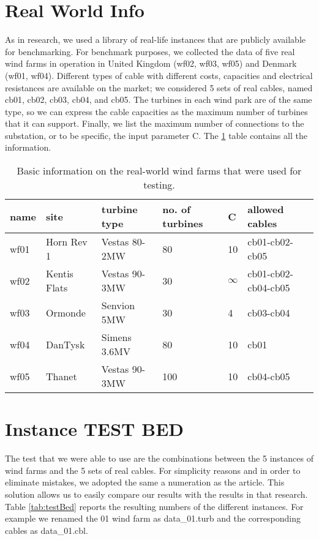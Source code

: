 \section{Real World Info}
As in \cite{wfcp} research, we used a library of real-life instances that are publicly available for benchmarking.
For benchmark purposes, we collected the data of five real wind farms in operation in United Kingdom (wf02, wf03, wf05) and Denmark (wf01, wf04). Different types of cable with different costs, capacities and electrical resistances are available on the market; we considered 5 sets of real cables, named cb01, cb02, cb03, cb04, and cb05. The turbines in each wind park are of the same type, so we can express the cable capacities as the maximum number of turbines that it can support. Finally, we list the maximum number of connections to the substation, or to be specific, the input parameter C. The \ref{tab:realWorld} table contains all the information.
\begin{table}[!htbp]\label{tab:realWorld}
\center
\begin{tabular}{llllll}
\hline
name & site         & turbine type  & no. of turbines & C  & allowed cables      \\ \hline
wf01 & Horn Rev 1   & Vestas 80-2MW & 80              & 10 & cb01-cb02-cb05      \\
wf02 & Kentis Flats & Vestas 90-3MW & 30              & $\infty$   & cb01-cb02-cb04-cb05 \\
wf03 & Ormonde      & Senvion 5MW   & 30              & 4  & cb03-cb04           \\
wf04 & DanTysk      & Simens 3.6MV  & 80              & 10 & cb01                \\
wf05 & Thanet       & Vestas 90-3MW & 100             & 10 & cb04-cb05           \\ \hline
\end{tabular}
\caption{Basic information on the real-world wind farms that were used for testing.}
\end{table}

\section{Instance TEST BED}
The test that we were able to use are the combinations between the 5 instances of wind farms and the 5 sets of real cables. For simplicity reasons and in order to eliminate mistakes, we adopted the same a numeration as the \cite{wfcp} article. This solution allows us to easily compare our results with the results in that research. 
Table \ref{tab:testBed} reports the resulting numbers of the different instances. For example we renamed the 01 wind farm as data\_01.turb and the corresponding cables as data\_01.cbl. 

